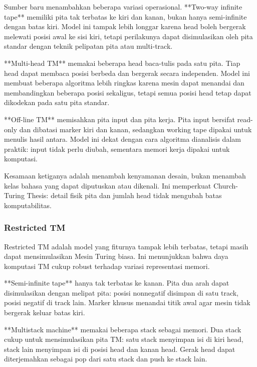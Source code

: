 Sumber baru menambahkan beberapa variasi operasional. **Two-way infinite tape** memiliki pita tak terbatas ke kiri dan kanan, bukan hanya semi-infinite dengan batas kiri. Model ini tampak lebih longgar karena head boleh bergerak melewati posisi awal ke sisi kiri, tetapi perilakunya dapat disimulasikan oleh pita standar dengan teknik pelipatan pita atau multi-track.

**Multi-head TM** memakai beberapa head baca-tulis pada satu pita. Tiap head dapat membaca posisi berbeda dan bergerak secara independen. Model ini membuat beberapa algoritma lebih ringkas karena mesin dapat menandai dan membandingkan beberapa posisi sekaligus, tetapi semua posisi head tetap dapat dikodekan pada satu pita standar.

**Off-line TM** memisahkan pita input dan pita kerja. Pita input bersifat read-only dan dibatasi marker kiri dan kanan, sedangkan working tape dipakai untuk menulis hasil antara. Model ini dekat dengan cara algoritma dianalisis dalam praktik: input tidak perlu diubah, sementara memori kerja dipakai untuk komputasi.

Kesamaan ketiganya adalah menambah kenyamanan desain, bukan menambah kelas bahasa yang dapat diputuskan atau dikenali. Ini memperkuat Church-Turing Thesis: detail fisik pita dan jumlah head tidak mengubah batas komputabilitas.

\subsubsection{Restricted TM}

\begin{jawab}
Restricted TM adalah model yang fiturnya tampak lebih terbatas, tetapi masih dapat mensimulasikan Mesin Turing biasa. Ini menunjukkan bahwa daya komputasi TM cukup robust terhadap variasi representasi memori.
\end{jawab}

**Semi-infinite tape** hanya tak terbatas ke kanan. Pita dua arah dapat disimulasikan dengan melipat pita: posisi nonnegatif disimpan di satu track, posisi negatif di track lain. Marker khusus menandai titik awal agar mesin tidak bergerak keluar batas kiri.

**Multistack machine** memakai beberapa stack sebagai memori. Dua stack cukup untuk mensimulasikan pita TM: satu stack menyimpan isi di kiri head, stack lain menyimpan isi di posisi head dan kanan head. Gerak head dapat diterjemahkan sebagai pop dari satu stack dan push ke stack lain.

